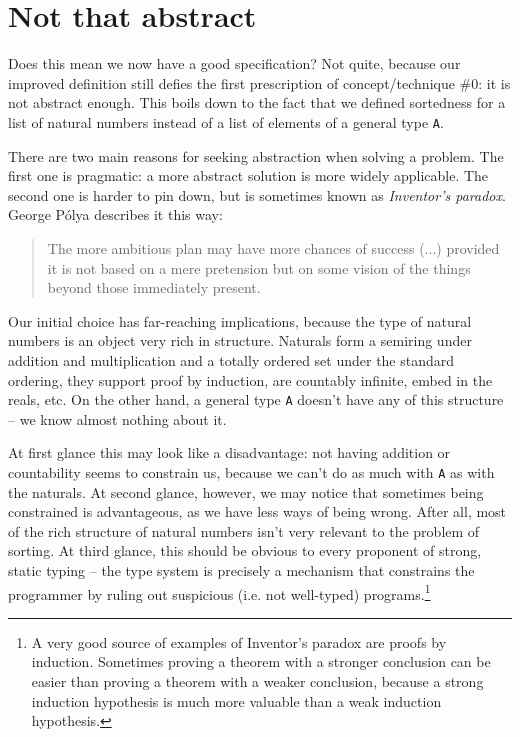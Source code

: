 \documentclass[declaration,mgr,english,shortabstract]{iithesis}
\newcommand{\m}[1]{\texttt{#1}}
\begin{document}
\section{Not that abstract} \label{notabstract}

Does this mean we now have a good specification? Not quite, because our improved definition still defies the first prescription of concept/technique \#0: it is not abstract enough. This boils down to the fact that we defined sortedness for a list of natural numbers instead of a list of elements of a general type \m{A}.

There are two main reasons for seeking abstraction when solving a problem. The first one is pragmatic: a more abstract solution is more widely applicable. The second one is harder to pin down, but is sometimes known as \textit{Inventor's paradox}. George Pólya describes it this way:

\begin{quote}
    The more ambitious plan may have more chances of success (...) provided it is not based on a mere pretension but on some vision of the things beyond those immediately present.\cite{Polya}
\end{quote}

Our initial choice has far-reaching implications, because the type of natural numbers is an object very rich in structure. Naturals form a semiring under addition and multiplication and a totally ordered set under the standard ordering, they support proof by induction, are countably infinite, embed in the reals, etc. On the other hand, a general type \m{A} doesn't have any of this structure -- we know almost nothing about it.

At first glance this may look like a disadvantage: not having addition or countability seems to constrain us, because we can't do as much with \m{A} as with the naturals. At second glance, however, we may notice that sometimes being constrained is advantageous, as we have less ways of being wrong. After all, most of the rich structure of natural numbers isn't very relevant to the problem of sorting. At third glance, this should be obvious to every proponent of strong, static typing -- the type system is precisely a mechanism that constrains the programmer by ruling out suspicious (i.e. not well-typed) programs.\footnote{A very good source of examples of Inventor's paradox are proofs by induction. Sometimes proving a theorem with a stronger conclusion can be easier than proving a theorem with a weaker conclusion, because a strong induction hypothesis is much more valuable than a weak induction hypothesis.}
\end{document}
